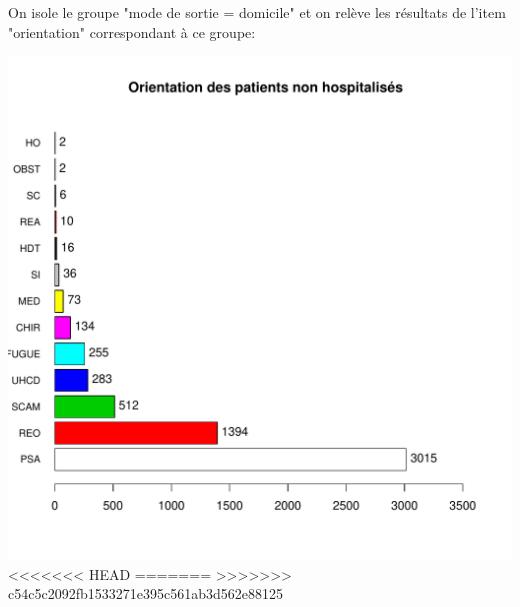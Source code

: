 \documentclass[12pt,english,french,twoside]{book}\usepackage[]{graphicx}\usepackage[]{color}
\makeatletter
\def\maxwidth{ %
  \ifdim\Gin@nat@width>\linewidth
    \linewidth
  \else
    \Gin@nat@width
  \fi
}
\makeatother
\begin{document}

On isole le groupe "mode de sortie = domicile" et on relève les résultats de l'item "orientation" correspondant à ce groupe:


\includegraphics[width=\maxwidth]{figure/fausses_sorties} 
<<<<<<< HEAD
=======
>>>>>>> c54c5c2092fb1533271e395c561ab3d562e88125
\end{document}

